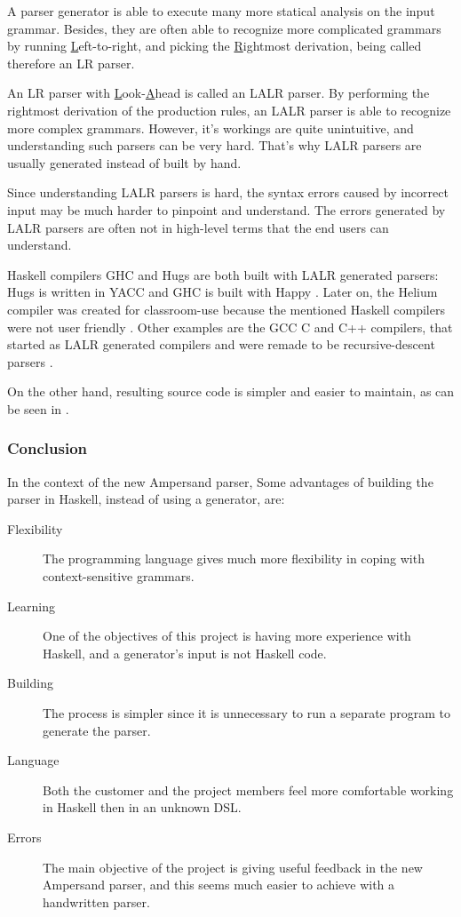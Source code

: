 %
A parser generator is able to execute many more statical analysis on the input grammar.
Besides, they are often able to recognize more complicated grammars by running \underline{L}eft-to-right, and picking the \underline{R}ightmost derivation, being called therefore an LR parser.

%
An LR parser with \underline{L}ook-\underline{A}head is called an LALR parser.
By performing the rightmost derivation of the production rules, an LALR parser is able to recognize more complex grammars.
However, it's workings are quite unintuitive, and understanding such parsers can be very hard.
That's why LALR parsers are usually generated instead of built by hand.

Since understanding LALR parsers is hard, the syntax errors caused by incorrect input may be much harder to pinpoint and understand.
The errors generated by LALR parsers are often not in high-level terms that the end users can understand.

%
%
%
%
%
Haskell compilers GHC and Hugs are both built with LALR generated parsers: Hugs is written in YACC \cite{hugs-parser} and GHC is built with Happy \cite{ghc-parser}.
Later on, the Helium compiler was created for classroom-use because the mentioned Haskell compilers were not user friendly \cite{helium-parser}.
Other examples are the GCC C and C++ compilers, that started as LALR generated compilers and were remade to be recursive-descent parsers \cite{gcc-c-parser} \cite{gcc-cpp-parser}.

On the other hand, resulting source code is simpler and easier to maintain, as can be seen in \cite{parser-examples}.

\subsubsection{Conclusion}
In the context of the new Ampersand parser, Some advantages of building the parser in Haskell, instead of using a generator, are:
\begin{description}
	\item[Flexibility] The programming language gives much more flexibility in coping with context-sensitive grammars.
	\item[Learning] One of the objectives of this project is having more experience with Haskell, and a generator's input is not Haskell code.
	\item[Building] The process is simpler since it is unnecessary to run a separate program to generate the parser.
	\item[Language] Both the customer and the project members feel more comfortable working in Haskell then in an unknown DSL.
	\item[Errors] The main objective of the project is giving useful feedback in the new Ampersand parser, and this seems much easier to achieve with a handwritten parser.
\end{description}

